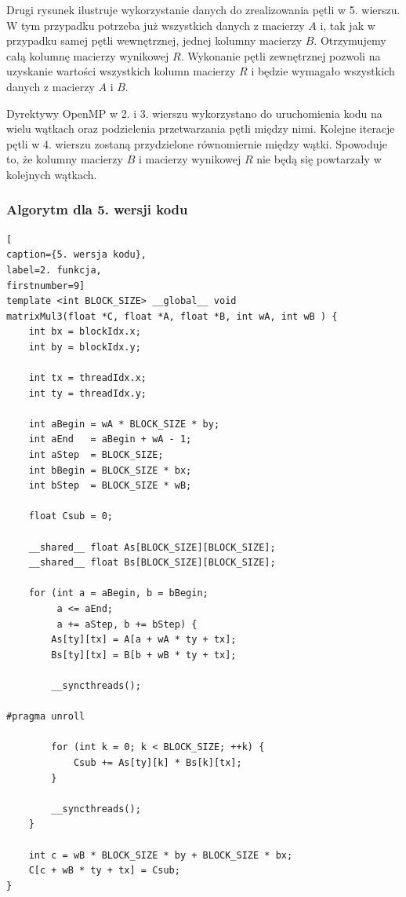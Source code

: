 \documentclass{article}
\begin{document}
Drugi rysunek ilustruje wykorzystanie danych do zrealizowania pętli w 5. wierszu. W tym przypadku potrzeba już wszystkich danych z macierzy $A$ i, tak jak w przypadku samej pętli wewnętrznej, jednej kolumny macierzy $B$. Otrzymujemy całą kolumnę macierzy wynikowej $R$. Wykonanie pętli zewnętrznej pozwoli na uzyskanie wartości wszystkich kolumn macierzy $R$ i będzie wymagało wszystkich danych z macierzy $A$ i $B$.

Dyrektywy OpenMP w 2. i 3. wierszu wykorzystano do uruchomienia kodu na wielu wątkach oraz podzielenia przetwarzania pętli między nimi. Kolejne iteracje pętli w 4. wierszu zostaną przydzielone równomiernie między wątki. Spowoduje to, że kolumny macierzy $B$ i macierzy wynikowej $R$ nie będą się powtarzały w kolejnych wątkach.

\subsubsection{Algorytm dla 5. wersji kodu}
\begin{lstlisting}[
caption={5. wersja kodu},
label=2. funkcja,
firstnumber=9]
template <int BLOCK_SIZE> __global__ void
matrixMul3(float *C, float *A, float *B, int wA, int wB ) {
    int bx = blockIdx.x;
    int by = blockIdx.y;
    
    int tx = threadIdx.x;
    int ty = threadIdx.y;
    
    int aBegin = wA * BLOCK_SIZE * by;
    int aEnd   = aBegin + wA - 1;
    int aStep  = BLOCK_SIZE;
    int bBegin = BLOCK_SIZE * bx;
    int bStep  = BLOCK_SIZE * wB;
    
    float Csub = 0;

    __shared__ float As[BLOCK_SIZE][BLOCK_SIZE];
    __shared__ float Bs[BLOCK_SIZE][BLOCK_SIZE];

    for (int a = aBegin, b = bBegin; 
    	 a <= aEnd;
    	 a += aStep, b += bStep) {
        As[ty][tx] = A[a + wA * ty + tx];
        Bs[ty][tx] = B[b + wB * ty + tx];
        
        __syncthreads();
        
#pragma unroll

        for (int k = 0; k < BLOCK_SIZE; ++k) {
            Csub += As[ty][k] * Bs[k][tx];
        }

        __syncthreads();
    }
    
    int c = wB * BLOCK_SIZE * by + BLOCK_SIZE * bx;
    C[c + wB * ty + tx] = Csub;    
}
\end{lstlisting}
\end{document}
